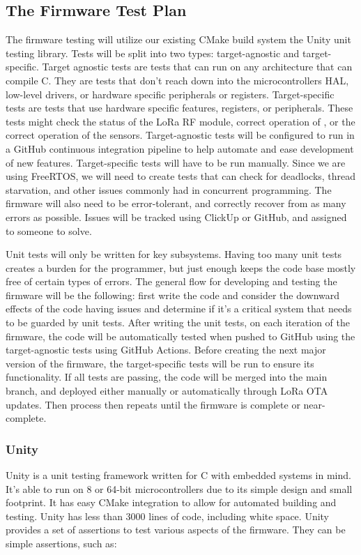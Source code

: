 \subsection{The Firmware Test Plan}
The firmware testing will utilize our existing CMake build system the Unity unit
testing library. Tests will be split into two types: target-agnostic and
target-specific. Target agnostic tests are tests that can run on any
architecture that can compile C. They are tests that don't reach down
into the microcontrollers HAL, low-level drivers, or hardware specific
peripherals or registers. Target-specific tests are tests that use hardware
specific features, registers, or peripherals. These tests might check the status
of the LoRa RF module, correct operation of \iic, or the correct operation of
the sensors. Target-agnostic tests will be configured to run in a GitHub
continuous integration pipeline to help automate and ease development of new
features. Target-specific tests will have to be run manually. Since we are using
FreeRTOS, we will need to create tests that can check for deadlocks, thread
starvation, and other issues commonly had in concurrent programming. The
firmware will also need to be error-tolerant, and correctly recover from as many
errors as possible. Issues will be tracked using ClickUp or GitHub, and assigned
to someone to solve.

Unit tests will only be written for key subsystems. Having too many unit tests
creates a burden for the programmer, but just enough keeps the code base mostly
free of certain types of errors. The general flow for developing and testing the
firmware will be the following: first write the code and consider the downward
effects of the code having issues and determine if it's a critical system that
needs to be guarded by unit tests. After writing the unit tests, on each
iteration of the firmware, the code will be automatically tested when pushed to
GitHub using the target-agnostic tests using GitHub Actions. Before creating the
next major version of the firmware, the target-specific tests will be run to
ensure its functionality. If all tests are passing, the code will be merged into
the main branch, and deployed either manually or automatically through LoRa OTA
updates. Then process then repeats until the firmware is complete or
near-complete.

\subsubsection{Unity}
Unity is a unit testing framework written for C with embedded systems in mind.
It's able to run on 8 or 64-bit microcontrollers due to its simple design and
small footprint. It has easy CMake integration to allow for automated building
and testing. Unity has less than 3000 lines of code, including white space.
Unity provides a set of assertions to test various aspects of the firmware. They
can be simple assertions, such as:

